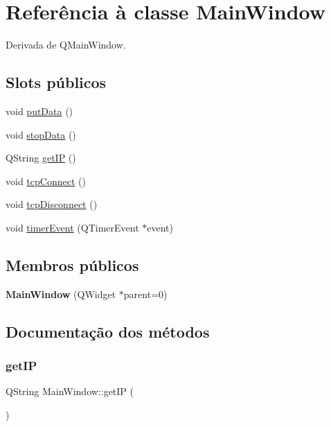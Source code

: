 \hypertarget{class_main_window}{}\section{Referência à classe Main\+Window}
\label{class_main_window}


Derivada de Q\+Main\+Window.

\subsection*{Slots públicos}
\begin{DoxyCompactItemize}
\item 
void \hyperlink{class_main_window_afdfeb13ec363b0eb8ecacaf0aa13b605}{put\+Data} ()
\item 
void \hyperlink{class_main_window_a79fdaf1fd769f0584f50da34e415b3de}{stop\+Data} ()
\item 
Q\+String \hyperlink{class_main_window_a2bf0fb2c40fb08b96f95f65d9ee1c979}{get\+IP} ()
\item 
void \hyperlink{class_main_window_ac5b669957c442b6eb68573dacfce33e1}{tcp\+Connect} ()
\item 
void \hyperlink{class_main_window_a4d22c4c7afc7ba0a2fa4c70515c85dda}{tcp\+Disconnect} ()
\item 
void \hyperlink{class_main_window_aaa425b1554af3c1f58cc70b4815082ae}{timer\+Event} (Q\+Timer\+Event $\ast$event)
\end{DoxyCompactItemize}
\subsection*{Membros públicos}
\begin{DoxyCompactItemize}
\item 
\mbox{\label{class_main_window_a8b244be8b7b7db1b08de2a2acb9409db}} 
{\bfseries Main\+Window} (Q\+Widget $\ast$parent=0)
\end{DoxyCompactItemize}


\subsection{Documentação dos métodos}
\mbox{\label{class_main_window_a2bf0fb2c40fb08b96f95f65d9ee1c979}} 
\subsubsection{\texorpdfstring{get\+IP}{getIP}}
{\footnotesize\ttfamily Q\+String Main\+Window\+::get\+IP (\begin{DoxyParamCaption}{ }\end{DoxyParamCaption})\hspace{0.3cm}{\ttfamily [slot]}}

